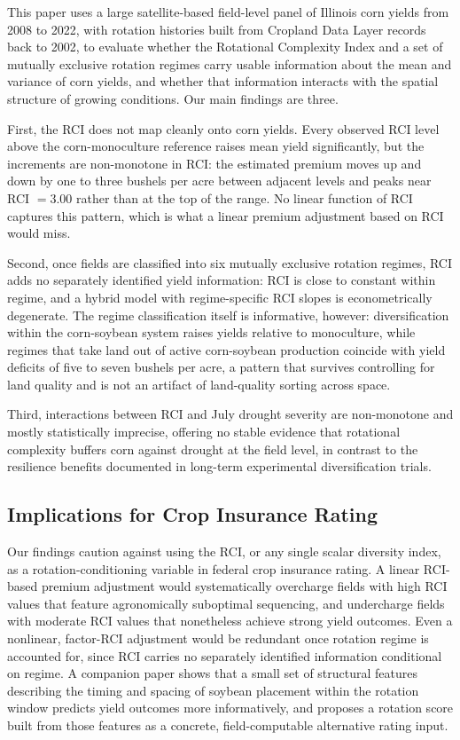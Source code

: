 \documentclass[12pt,letterpaper]{article}
\theoremstyle{remark}
\theoremstyle{remark}
\theoremstyle{plain}
\theoremstyle{definition}
\begin{document}
This paper uses a large satellite-based field-level panel of Illinois corn yields from 2008 to 2022, with rotation histories built from Cropland Data Layer records back to 2002, to evaluate whether the Rotational Complexity Index and a set of mutually exclusive rotation regimes carry usable information about the mean and variance of corn yields, and whether that information interacts with the spatial structure of growing conditions. Our main findings are three.

First, the RCI does not map cleanly onto corn yields. Every observed RCI level above the corn-monoculture reference raises mean yield significantly, but the increments are non-monotone in RCI: the estimated premium moves up and down by one to three bushels per acre between adjacent levels and peaks near RCI $=3.00$ rather than at the top of the range. No linear function of RCI captures this pattern, which is what a linear premium adjustment based on RCI would miss.

Second, once fields are classified into six mutually exclusive rotation regimes, RCI adds no separately identified yield information: RCI is close to constant within regime, and a hybrid model with regime-specific RCI slopes is econometrically degenerate. The regime classification itself is informative, however: diversification within the corn-soybean system raises yields relative to monoculture, while regimes that take land out of active corn-soybean production coincide with yield deficits of five to seven bushels per acre, a pattern that survives controlling for land quality and is not an artifact of land-quality sorting across space.

Third, interactions between RCI and July drought severity are non-monotone and mostly statistically imprecise, offering no stable evidence that rotational complexity buffers corn against drought at the field level, in contrast to the resilience benefits documented in long-term experimental diversification trials.

\subsection{\label{subsec:implications}Implications for Crop Insurance Rating}

Our findings caution against using the RCI, or any single scalar diversity index, as a rotation-conditioning variable in federal crop insurance rating. A linear RCI-based premium adjustment would systematically overcharge fields with high RCI values that feature agronomically suboptimal sequencing, and undercharge fields with moderate RCI values that nonetheless achieve strong yield outcomes. Even a nonlinear, factor-RCI adjustment would be redundant once rotation regime is accounted for, since RCI carries no separately identified information conditional on regime. A companion paper shows that a small set of structural features describing the timing and spacing of soybean placement within the rotation window predicts yield outcomes more informatively, and proposes a rotation score built from those features as a concrete, field-computable alternative rating input.
\end{document}
